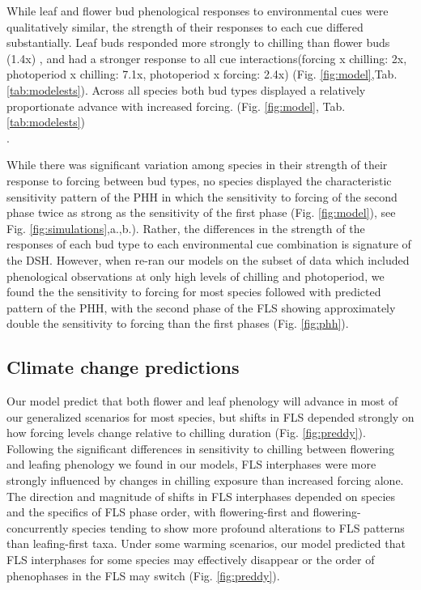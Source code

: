 \documentclass[11pt]{article}
\begin{document}
\noindent While leaf and flower bud phenological responses to environmental cues were qualitatively similar, the strength of their responses to each cue differed substantially. Leaf buds responded more strongly to chilling than flower buds (1.4x) , and had a stronger response to all cue interactions(forcing x chilling: 2x, photoperiod x chilling: 7.1x, photoperiod x forcing: 2.4x) (Fig. \ref{fig:model},Tab. \ref{tab:modelests}). Across all species both bud types displayed a relatively proportionate advance with increased forcing. (Fig. \ref{fig:model}, Tab. \ref{tab:modelests})\\. 

\noindent While there was significant variation among species in their strength of their response to forcing between bud types, no species displayed the characteristic sensitivity pattern of the PHH in which the sensitivity to forcing of the second phase twice as strong as the sensitivity of the first phase (Fig. \ref{fig:model}), see Fig. \ref{fig:simulations},a.,b.). Rather, the differences in the strength of the responses of each bud type to each environmental cue combination is signature of the DSH. However, when re-ran our models on the subset of data which included phenological observations at only high levels of chilling and photoperiod, we found the the sensitivity to forcing for most species followed with predicted pattern of the PHH, with the second phase of the FLS showing approximately double the sensitivity to forcing than the first phases (Fig. \ref{fig:phh}).\\ %

    \subsection*{Climate change predictions}
\noindent Our model predict that both flower and leaf phenology will advance in most of our generalized scenarios for most species, but shifts in FLS depended strongly on how forcing levels change relative to chilling duration (Fig. \ref{fig:preddy}). Following the significant differences in sensitivity to chilling between flowering and leafing phenology we found in our models, FLS interphases were more strongly influenced by changes in chilling exposure than increased forcing alone. The direction and magnitude of shifts in FLS interphases depended on species and the specifics of FLS phase order, with flowering-first and flowering-concurrently species tending to show more profound alterations to FLS patterns than leafing-first taxa. Under some warming scenarios, our model predicted that  FLS interphases for some species may effectively disappear or the order of phenophases in the FLS may switch (Fig. \ref{fig:preddy}).
\end{document}
